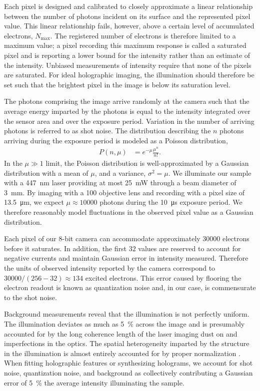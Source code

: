Each pixel is designed and calibrated to closely approximate a linear relationship
between the number of photons incident on its surface and the represented pixel value.
This linear relationship fails, however, above a certain level of accumulated electrons,
$N_{\text{max}}$.
The registered number of electrons is therefore limited to a maximum value; a
pixel recording this maximum response is called a saturated pixel and is reporting
a lower bound for the intensity rather than an estimate of the intensity.
Unbiased measurements of intensity require that none of the pixels are saturated.
For ideal holographic imaging, the illumination should therefore be set such that the
brightest pixel in the image is below its saturation level.

The photons comprising the image arrive randomly at the camera
such that the average energy imparted by the photons is equal to the intensity
integrated over the sensor area and over the exposure period. Variation in the number
of arriving photons is referred to as shot noise.
The distribution describing the $n$ photons arriving during the exposure period
is modeled as a Poisson distribution,
\begin{align}
  P(n, \mu ) &= e^{-\mu} \frac{\mu^n}{n!}.
  \label{eq:poisson}
\end{align}
In the $\mu \gg 1$ limit, the Poisson distribution is well-approximated by a Gaussian distribution
with a mean of $\mu$, and a variance, $\sigma^2=\mu$. We
illuminate our sample with a \SI{447}{\nm} laser providing at most \SI{25}{\milli\watt}
through a beam diameter of \SI{3}{\milli\meter}. By imaging with a \SI{100}{\times} objective
lens and recording with a pixel size of \SI{13.5}{\um}, we expect $\mu \approx \num{10000}$
photons during the \SI{10}{\us} exposure period. We therefore reasonably model
fluctuations in the observed pixel value as a Gaussian distribution.

Each pixel of our $8$-bit camera can accommodate approximately \num{30000} electrons before
it saturates. In addition, the first
$32$ values are reserved to account for negative currents and maintain Gaussian
error in intensity measured. Therefore the units of observed intensity reported by the
camera correspond to $30000/(256-32) \approx 134$ excited electrons. This error
caused by flooring the electron readout is known as quantization noise and, in our case,
is commensurate to the shot noise.

Background measurements reveal that the illumination is not perfectly uniform. The illumination
deviates as much as \SI{5}{\percent} across the image and is presumably accounted for by the
long coherence length of the laser imaging dust on and imperfections in the optics.
The spatial heterogeneity imparted by the structure in the illumination is almost
entirely accounted for by proper normalization \cite{lee07a}. When fitting holographic
features or synthesizing holograms, we account for shot noise,
quantization noise, and background as collectively contributing a Gaussian error
of \SI{5}{\percent} the average intensity illuminating the sample.



